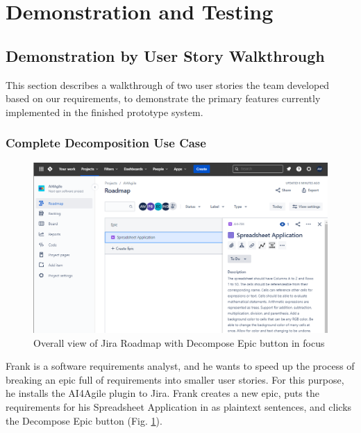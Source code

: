 \section{Demonstration and Testing}
\label{demo}

\subsection{Demonstration by User Story Walkthrough}

This section describes a walkthrough of two user stories the team developed based on our requirements, to demonstrate the primary features currently implemented in the finished prototype system. 

\subsubsection{Complete Decomposition Use Case}
\label{Scenario1}

\begin{figure}
\centering
\includegraphics[width=\textwidth,keepaspectratio]{./figure/Scenario1Figure1.png}
\caption{Overall view of Jira Roadmap with Decompose Epic button in focus}
\label{fig:Scenario1Figure1}
\end{figure}

Frank is a software requirements analyst, and he wants to speed up the process of breaking an epic full of requirements into smaller user stories. For this purpose, he installs the AI4Agile plugin to Jira. Frank creates a new epic, puts the requirements for his Spreadsheet Application in as plaintext sentences, and clicks the Decompose Epic button (Fig. \ref{fig:Scenario1Figure1}).

